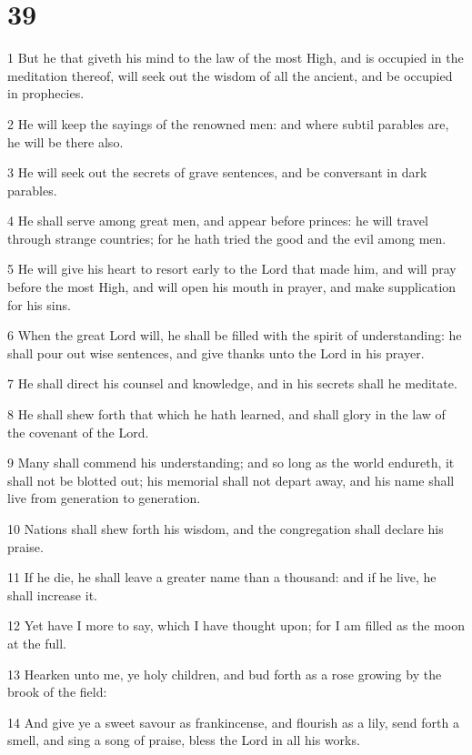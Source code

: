 \chapter{39}

\par 1 But he that giveth his mind to the law of the most High, and is occupied in the meditation thereof, will seek out the wisdom of all the ancient, and be occupied in prophecies.
\par 2 He will keep the sayings of the renowned men: and where subtil parables are, he will be there also.
\par 3 He will seek out the secrets of grave sentences, and be conversant in dark parables.
\par 4 He shall serve among great men, and appear before princes: he will travel through strange countries; for he hath tried the good and the evil among men.
\par 5 He will give his heart to resort early to the Lord that made him, and will pray before the most High, and will open his mouth in prayer, and make supplication for his sins.
\par 6 When the great Lord will, he shall be filled with the spirit of understanding: he shall pour out wise sentences, and give thanks unto the Lord in his prayer.
\par 7 He shall direct his counsel and knowledge, and in his secrets shall he meditate.
\par 8 He shall shew forth that which he hath learned, and shall glory in the law of the covenant of the Lord.
\par 9 Many shall commend his understanding; and so long as the world endureth, it shall not be blotted out; his memorial shall not depart away, and his name shall live from generation to generation.
\par 10 Nations shall shew forth his wisdom, and the congregation shall declare his praise.
\par 11 If he die, he shall leave a greater name than a thousand: and if he live, he shall increase it.
\par 12 Yet have I more to say, which I have thought upon; for I am filled as the moon at the full.
\par 13 Hearken unto me, ye holy children, and bud forth as a rose growing by the brook of the field:
\par 14 And give ye a sweet savour as frankincense, and flourish as a lily, send forth a smell, and sing a song of praise, bless the Lord in all his works.
